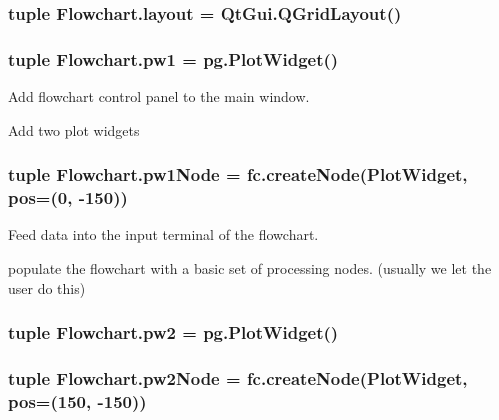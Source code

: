 \subsubsection[{layout}]{\setlength{\rightskip}{0pt plus 5cm}tuple Flowchart.\+layout = Qt\+Gui.\+Q\+Grid\+Layout()}\label{namespaceFlowchart_a7c65bdf9588d2e20126ed9915552be1d}
\hypertarget{namespaceFlowchart_a626e983c67d5de28756f40bf152d7cca}{}
\subsubsection[{pw1}]{\setlength{\rightskip}{0pt plus 5cm}tuple Flowchart.\+pw1 = pg.\+Plot\+Widget()}\label{namespaceFlowchart_a626e983c67d5de28756f40bf152d7cca}


Add flowchart control panel to the main window. 

Add two plot widgets \hypertarget{namespaceFlowchart_acd2501986ff39a534fd62ecda0487108}{}
\subsubsection[{pw1\+Node}]{\setlength{\rightskip}{0pt plus 5cm}tuple Flowchart.\+pw1\+Node = fc.\+create\+Node(\textquotesingle{}Plot\+Widget\textquotesingle{}, pos=(0, -\/150))}\label{namespaceFlowchart_acd2501986ff39a534fd62ecda0487108}


Feed data into the input terminal of the flowchart. 

populate the flowchart with a basic set of processing nodes. (usually we let the user do this) \hypertarget{namespaceFlowchart_a7312d9e0a403b4d8f1b99a0a65c178eb}{}
\subsubsection[{pw2}]{\setlength{\rightskip}{0pt plus 5cm}tuple Flowchart.\+pw2 = pg.\+Plot\+Widget()}\label{namespaceFlowchart_a7312d9e0a403b4d8f1b99a0a65c178eb}
\hypertarget{namespaceFlowchart_adb645108dfae32e4c6f93efc3876c876}{}
\subsubsection[{pw2\+Node}]{\setlength{\rightskip}{0pt plus 5cm}tuple Flowchart.\+pw2\+Node = fc.\+create\+Node(\textquotesingle{}Plot\+Widget\textquotesingle{}, pos=(150, -\/150))}\label{namespaceFlowchart_adb645108dfae32e4c6f93efc3876c876}
\hypertarget{namespaceFlowchart_adb242633cef63f930a6b70acdbbfec00}{}
